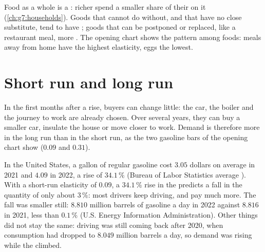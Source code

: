 Food as a whole is a : richer  spend a smaller share of their  on it
(\cref{ch:g7:households}). Goods that  cannot do
without, and that have no close substitute, tend to have ; goods that can be postponed or
replaced, like a restaurant meal, more . The opening chart shows the pattern among foods:
meals away from home have the highest elasticity, eggs the lowest.

\section{Short run and long run}

In the first months after a  rise, buyers can change little: the car, the boiler and the journey to
work are already chosen. Over several years, they can buy a smaller car, insulate the house or move
closer to work. Demand is therefore more  in the long run than in the short run, as the two
gasoline bars of the opening chart show ($0.09$ and $0.31$).

\begin{record}[Fuel prices in 2022]
In the United States, a gallon of regular gasoline cost $3.05$ dollars on average in 2021 and $4.09$ in
2022, a rise of $34.1\,\%$ (Bureau of Labor Statistics average ). With a short-run elasticity of
$0.09$, a $34.1\,\%$ rise in the  predicts a fall in the quantity of only about $3\,\%$: most
drivers keep driving, and pay much more. The fall was smaller still: $8.810$ million barrels of gasoline
a day in 2022 against $8.816$ in 2021, less than $0.1\,\%$ (U.S. Energy Information Administration).
Other things did not stay the same: driving was still coming back after 2020, when consumption had
dropped to $8.049$ million barrels a day, so demand was rising while the  climbed.
\end{record}

